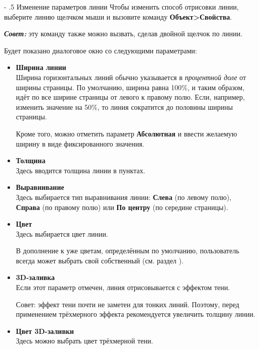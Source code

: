﻿\documentclass[a4paper,10pt]{article}
\makeatletter
\renewcommand\paragraph{%
   \@startsection{paragraph}{4}{0mm}%
      {-\baselineskip}%
      {.5\baselineskip}%
      {\normalfont\normalsize\bfseries}}
\makeatother
\begin{document}
\paragraph{Изменение параметров линии}
Чтобы изменить способ отрисовки линии, выберите линию щелчком мыши и вызовите команду \textbf{Объект>Свойства}.

\begin{mdframed}[backgroundcolor=blue!10]
\textbf{\textit{Совет:}} эту команду также можно вызвать, сделав двойной щелчок по линии.
\end{mdframed}

Будет показано диалоговое окно со следующими параметрами:
\begin{itemize}
 \item \textbf{Ширина линии}\\
 Ширина горизонтальных линий  обычно указывается в \textit{процентной доле} от ширины страницы. По умолчанию, ширина равна 100\%, и таким образом, идёт по все ширине страницы от левого к правому полю. Если, например, изменить значение на 50\%, то линия сократится до половины ширины страницы.
 
 Кроме того, можно отметить параметр \textbf{Абсолютная} и ввести желаемую ширину в виде фиксированного значения.
 \item \textbf{Толщина}\\
 Здесь вводится толщина линии в пунктах.
 \item \textbf{Выравнивание}\\
 Здесь выбирается тип выравнивания линии: \textbf{Слева} (по левому полю), \textbf{Справа} (по правому полю) или \textbf{По центру} (по середине страницы).
 \item \textbf{Цвет}\\
 Здесь выбирается цвет линии.
 
 В дополнение к уже цветам, определённым по умолчанию, пользователь всегда может выбрать свой собственный (см. раздел ).
 \item \textbf{3D-заливка}\\
 Если этот параметр отмечен, линия отрисовывается с эффектом тени.
 
 Совет: эффект тени почти не заметен для тонких линий. Поэтому, перед применением трёхмерного эффекта рекомендуется увеличить толщину линии.
 \item \textbf{Цвет 3D-заливки}\\
 Здесь можно выбрать цвет трёхмерной тени.
\end{itemize}
\end{document}
